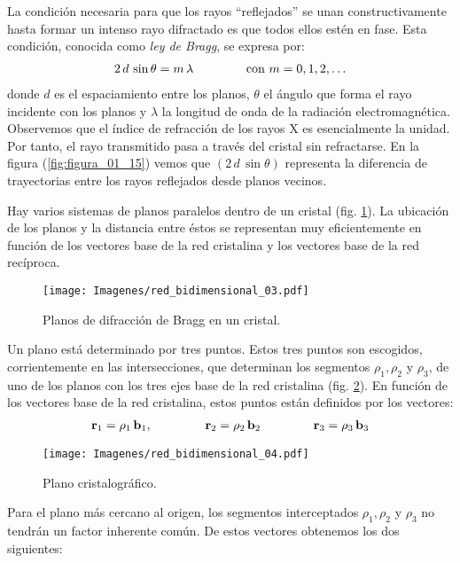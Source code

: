 La condición necesaria para que los rayos \enquote{reflejados} se unan constructivamente hasta formar un intenso rayo difractado es que todos ellos estén en fase. Esta condición, conocida como \emph{ley de Bragg}, se expresa por:
\begin{align*}
    2 \, d \, \sin \theta = m \, \lambda \hspace{1.5cm} \text{con } m = 0, 1, 2, \ldots
\end{align*}
donde $d$ es el espaciamiento entre los planos, $\theta$ el ángulo que forma el rayo incidente con los planos y $\lambda$ la longitud de onda de la radiación electromagnética. Observemos que el índice de refracción de los rayos X es esencialmente la unidad. Por tanto, el rayo transmitido pasa a través del cristal sin refractarse. En la figura (\ref{fig:figura_01_15}) vemos que $(2 \, d \, \sin \theta)$ representa la diferencia de trayectorias entre los rayos reflejados desde planos vecinos.
\par
Hay varios sistemas de planos paralelos dentro de un cristal (fig. \ref{fig:figura_01_16}). La ubicación de los planos y la distancia entre éstos se representan muy eficientemente en función de los vectores base de la red cristalina y los vectores base de la red recíproca. 
\begin{figure}[H]
    \centering
    \texttt{[image: Imagenes/red\_bidimensional\_03.pdf]}
    \caption{Planos de difracción de Bragg en un cristal.}
    \label{fig:figura_01_16}
\end{figure}
Un plano está determinado por tres puntos. Estos tres puntos son escogidos, corrientemente en las intersecciones, que determinan los segmentos $\rho_{1}, \rho_{2}$ y $\rho_{3}$, de uno de los planos con los tres ejes base de la red cristalina (fig. \ref{fig:figura_01_17}). En función de los vectores base de la red cristalina, estos puntos están definidos por los vectores:
\begin{align*}
    \vb{r}_{1} = \rho_{1} \, \vb{b}_{1}, \hspace{1.5cm} \vb{r}_{2} =\rho_{2} \, \vb{b}_{2} \hspace{1.5cm} \vb{r}_{3} = \rho_{3} \, \vb{b}_{3}
\end{align*}
\begin{figure}[H]
    \centering
    \texttt{[image: Imagenes/red\_bidimensional\_04.pdf]}
    \caption{Plano cristalográfico.}
    \label{fig:figura_01_17}
\end{figure}
Para el plano más cercano al origen, los segmentos interceptados $\rho_{1}, \rho_{2}$ y $\rho_{3}$ no tendrán un factor inherente común. De estos vectores obtenemos los dos siguientes:

